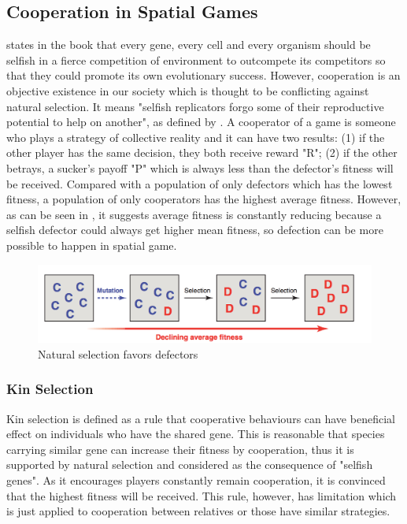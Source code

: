 \subsection{Cooperation in Spatial Games}
\citet{dawkins2006selfish} states in the book that every gene, every cell and every organism should be selfish in a fierce competition of environment to outcompete its competitors so that they could promote its own evolutionary success. However, cooperation is an objective existence in our society which is thought to be conflicting against natural selection.  It means "selfish  replicators forgo some of their reproductive potential to help on another", as defined by \citet{nowak2006five}. A cooperator of a game is someone who plays a strategy of  collective reality and it can have two results: (1) if the other player has the same decision, they both receive reward "R"; (2) if the other betrays, a sucker's payoff "P" which is always less than the defector's fitness will be received. Compared with a population of only defectors which has the lowest fitness, a population of only cooperators has the highest average fitness. However, as can be seen in , it suggests average fitness is constantly reducing because a selfish defector could always get higher mean fitness, so defection can be more possible to happen in spatial game.
\begin{figure}[!htb]
  \centering
  \includegraphics[width=12cm]{figns.png}
  \caption[Natural selection favors defectors]{Natural selection favors defectors \citep{nowak2006five}}
  \label{Figure:figns}
\end{figure}

\subsubsection{Kin Selection}
Kin selection is defined as a rule that cooperative behaviours can have beneficial effect on individuals who have the shared gene. This is reasonable that species carrying similar gene can increase their fitness by cooperation, thus it is supported by natural selection and considered as the consequence of "selfish genes". As it encourages players constantly remain cooperation, it is convinced that the highest fitness will be received. This rule, however, has limitation which is just applied to cooperation between relatives or those have similar strategies.
